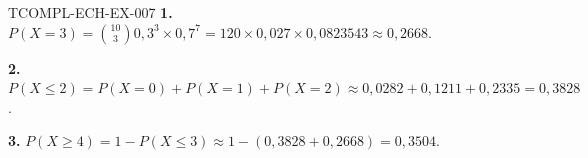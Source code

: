 \begin{corrige}{TCOMPL-ECH-EX-007}
\textbf{1.} $P(X=3)=\binom{10}{3}0{,}3^3\times0{,}7^7
=120\times0{,}027\times0{,}0823543\approx0{,}2668$.

\textbf{2.} $P(X\leq2)=P(X=0)+P(X=1)+P(X=2)\approx0{,}0282+0{,}1211+0{,}2335
=0{,}3828$.

\textbf{3.} $P(X\geq4)=1-P(X\leq3)\approx1-(0{,}3828+0{,}2668)=0{,}3504$.
\end{corrige}
